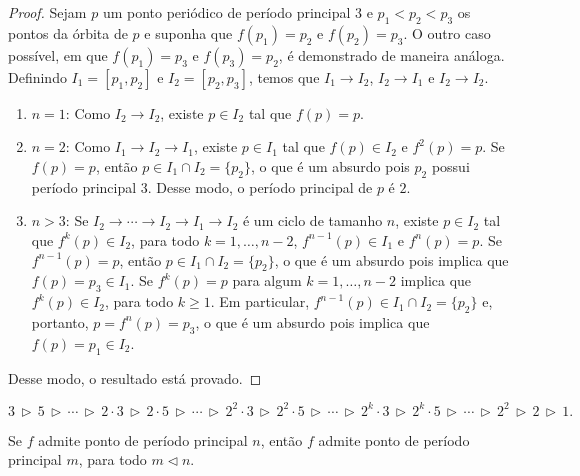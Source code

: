 \begin{proof}
Sejam $p$ um ponto periódico de período principal $3$ e $p_1 < p_2 < p_3$ os pontos da órbita de $p$ e suponha que $f(p_1) = p_2$ e $f(p_2) = p _3$. O outro caso possível, em que $f(p_1) = p_3$ e $f(p_3) = p_2$, é demonstrado de maneira análoga. Definindo $I_1 = [p_1, p_2]$ e $I_2 = [p_2, p_3]$, temos que $I_1 \longrightarrow I_2$, $I_2 \longrightarrow I_1$ e $I_2 \longrightarrow I_2$.
\begin{enumerate}[label=(\alph*)]
\item $n = 1$: Como $I_2 \longrightarrow I_2$, existe $p \in I_2$ tal que $f(p) = p$.
\item $n = 2$: Como $I_1 \longrightarrow I_2 \longrightarrow I_1$, existe $p \in I_1$ tal que $f(p) \in I_2$ e $f^2(p) = p$. Se $f(p) = p$, então $p \in I_1 \cap I_2 = \{p_2\}$, o que é um absurdo pois $p_2$ possui período principal 3. Desse modo, o período principal de $p$ é $2$.
\item $n > 3$: Se $I_2 \longrightarrow \cdots \longrightarrow I_2 \longrightarrow I_1 \longrightarrow I_2$ é um ciclo de tamanho $n$, existe $p \in I_2$ tal que $f^k(p) \in I_2$, para todo $k = 1, \dots, n-2$, $f^{n-1}(p) \in I_1$ e $f^n(p) = p$. Se $f^{n-1}(p) = p$, então $p \in I_1 \cap I_2 = \{p_2\}$, o que é um absurdo pois implica que $f(p) = p_3 \in I_1$. Se $f^k(p) = p$ para algum $k = 1, \dots, n-2$ implica que $f^k(p) \in I_2$, para todo $k \geq 1$. Em particular, $f^{n-1}(p) \in I_1 \cap I_2 = \{p_2\}$ e, portanto, $p = f^n(p) = p_3$, o que é um absurdo pois implica que $f(p) = p_1 \in I_2$. 
\end{enumerate}
Desse modo, o resultado está provado.
\end{proof}

\begin{definition}
$$3 \,\triangleright\, 5 
\,\triangleright\, \cdots \,\triangleright\,
2 \cdot 3 \,\triangleright\, 2 \cdot 5 
\,\triangleright\, \cdots \,\triangleright\,
2^2 \cdot 3 \,\triangleright\, 2^2 \cdot 5
\,\triangleright\, \cdots \,\triangleright\,
2^k \cdot 3 \,\triangleright\, 2^k \cdot 5
\,\triangleright\, \cdots \,\triangleright\,
2^2 \,\triangleright\, 2 \,\triangleright\, 1.$$
\end{definition}

\begin{theorem}[Sharkovsky]
Se $f$ admite ponto de período principal $n$, então $f$ admite ponto de período principal $m$, para todo $m \triangleleft n$.
\end{theorem}


